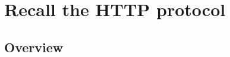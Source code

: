 \documentclass[presentation]{beamer}\mode<presentation>{\usetheme{AMSBolognaFC}}
\begin{document}







\section{Recall the HTTP protocol}

\subsection{Overview}
\end{document}
